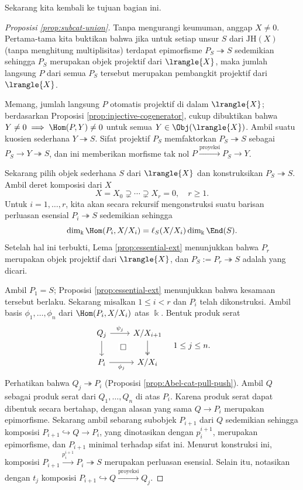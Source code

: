 Sekarang kita kembali ke tujuan bagian ini.

\begin{proof}[Proposisi \ref{prop:subcat-union}]
	Tanpa mengurangi keumuman, anggap $X \neq 0$. Pertama-tama kita buktikan bahwa jika untuk setiap unsur $S$ dari $\mathrm{JH}(X)$ (tanpa menghitung multiplisitas) terdapat epimorfisme $P_S \twoheadrightarrow S$ sedemikian sehingga $P_S$ merupakan objek projektif dari $\lrangle{X}$, maka jumlah langsung $P$ dari semua $P_S$ tersebut merupakan pembangkit projektif dari $\lrangle{X}$.
	
	Memang, jumlah langsung $P$ otomatis projektif di dalam $\lrangle{X}$; berdasarkan Proposisi \ref{prop:injective-cogenerator}, cukup dibuktikan bahwa $Y \neq 0 \implies \Hom(P, Y) \neq 0$ untuk semua $Y \in \Obj(\lrangle{X})$. Ambil suatu kuosien sederhana $Y \twoheadrightarrow S$. Sifat projektif $P_S$ memfaktorkan $P_S \twoheadrightarrow S$ sebagai $P_S \to Y \twoheadrightarrow S$, dan ini memberikan morfisme tak nol $P \xrightarrow{\text{proyeksi}} P_S \to Y$.
	
	Sekarang pilih objek sederhana $S$ dari $\lrangle{X}$ dan konstruksikan $P_S \twoheadrightarrow S$. Ambil deret komposisi dari $X$
	\[ X = X_0 \supsetneq \cdots \supsetneq X_r = 0, \quad r \geq 1. \]
	Untuk $i = 1, \ldots, r$, kita akan secara rekursif mengonstruksi suatu barisan perluasan esensial $P_i \twoheadrightarrow S$ sedemikian sehingga
	\[ \dim_{\Bbbk} \Hom(P_i, X/X_i) = \ell_S(X/X_i) \dim_{\Bbbk} \End(S). \]
	Setelah hal ini terbukti, Lema \ref{prop:essential-ext} menunjukkan bahwa $P_r$ merupakan objek projektif dari $\lrangle{X}$, dan $P_S := P_r \twoheadrightarrow S$ adalah yang dicari.

	Ambil $P_1 = S$; Proposisi \ref{prop:essential-ext} menunjukkan bahwa kesamaan tersebut berlaku. Sekarang misalkan $1 \leq i < r$ dan $P_i$ telah dikonstruksi. Ambil basis $\phi_1, \ldots, \phi_n$ dari $\Hom(P_i, X/X_i)$ atas $\Bbbk$. Bentuk produk serat
	\[\begin{tikzcd}
		Q_j \arrow[d] \arrow[r, "{\psi_j}"] & X/X_{i+1} \arrow[twoheadrightarrow, d] \\
		P_i \arrow[r, "{\phi_j}"'] & X/X_i \arrow[phantom, lu, "\Box" description]
	\end{tikzcd} \quad 1 \leq j \leq n.\]
	Perhatikan bahwa $Q_j \twoheadrightarrow P_i$ (Proposisi \ref{prop:Abel-cat-pull-push}). Ambil $Q$ sebagai produk serat dari $Q_1, \ldots, Q_n$ di atas $P_i$. Karena produk serat dapat dibentuk secara bertahap, dengan alasan yang sama $Q \to P_i$ merupakan epimorfisme. Sekarang ambil sebarang subobjek $P_{i+1}$ dari $Q$ sedemikian sehingga komposisi $P_{i+1} \hookrightarrow Q \to P_i$, yang dinotasikan dengan $p^{i+1}_i$, merupakan epimorfisme, dan $P_{i+1}$ minimal terhadap sifat ini. Menurut konstruksi ini, komposisi $P_{i+1} \xrightarrow{p^{i+1}_i} P_i \twoheadrightarrow S$ merupakan perluasan esensial. Selain itu, notasikan dengan $t_j$ komposisi $P_{i+1} \hookrightarrow Q \xrightarrow{\text{proyeksi}} Q_j$.
	

\end{proof}
